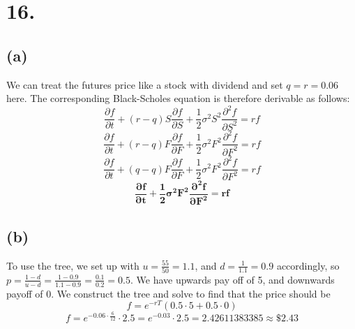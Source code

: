 \documentclass{article}
\begin{document}
{\Large 

\section*{16.}

\subsection*{(a)}

We can treat the futures price like a stock with dividend and set \(q = r = 0.06\) here. The corresponding Black-Scholes equation is therefore derivable as follows:
\[
  \frac{\partial f}{\partial t} + (r - q) S \frac{\partial f}{\partial S} + \frac{1}{2} \sigma^2 S^2 \frac{\partial^2 f}{\partial S^2} = rf
\]
\[
  \frac{\partial f}{\partial t} + (r - q) F \frac{\partial f}{\partial F} + \frac{1}{2} \sigma^2 F^2 \frac{\partial^2 f}{\partial F^2} = rf
\]
\[
  \frac{\partial f}{\partial t} + (q - q) F \frac{\partial f}{\partial F} + \frac{1}{2} \sigma^2 F^2 \frac{\partial^2 f}{\partial F^2} = rf
\]
\[
  \boxed{\mathbf{\frac{\partial f}{\partial t} + \frac{1}{2} \sigma^2 F^2 \frac{\partial^2 f}{\partial F^2} = rf}}
\]

\subsection*{(b)}

To use the tree, we set up with \(u = \frac{55}{50} = 1.1\), and \(d = \frac{1}{1.1} = 0.9 \) accordingly, so \(p = \frac{1 - d}{u - d} = \frac{1 - 0.9}{1.1 - 0.9} = \frac{0.1}{0.2} = 0.5\). We have upwards pay off of 5, and downwards payoff of 0. We construct the tree and solve to find that the price should be 
\[
  f = e^{-rT} (0.5 \cdot 5 + 0.5 \cdot 0)
\]
\[
  f = e^{-0.06 \cdot \frac{6}{12}} \cdot 2.5 = e^{-0.03} \cdot 2.5 = 2.42611383385 \approx \boxed{\mathbf{\$2.43}}
\]


}
\end{document}
